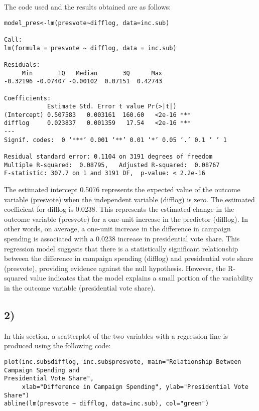 \documentclass[oneside]{article}
\begin{document}
\hspace{1}

The code used and the results obtained are as follows:
\begin{verbatim}
model_pres<-lm(presvote~difflog, data=inc.sub)

Call:
lm(formula = presvote ~ difflog, data = inc.sub)

Residuals:
     Min       1Q   Median       3Q      Max 
-0.32196 -0.07407 -0.00102  0.07151  0.42743 

Coefficients:
            Estimate Std. Error t value Pr(>|t|)    
(Intercept) 0.507583   0.003161  160.60   <2e-16 ***
difflog     0.023837   0.001359   17.54   <2e-16 ***
---
Signif. codes:  0 ‘***’ 0.001 ‘**’ 0.01 ‘*’ 0.05 ‘.’ 0.1 ‘ ’ 1

Residual standard error: 0.1104 on 3191 degrees of freedom
Multiple R-squared:  0.08795,	Adjusted R-squared:  0.08767 
F-statistic: 307.7 on 1 and 3191 DF,  p-value: < 2.2e-16
\end{verbatim}

The estimated intercept 0.5076 represents the expected value of the outcome variable (presvote) when the independent variable (difflog) is zero. 
The estimated coefficient for difflog is 0.0238. This represents the estimated change in the outcome variable (presvote) for a one-unit increase in the predictor (difflog). In other words, on average, a one-unit increase in the difference in campaign spending is associated with a 0.0238 increase in presidential vote share.
This regression model suggests that there is a statistically significant relationship between the difference in campaign spending (difflog) and presidential vote share (presvote), providing evidence against the null hypothesis. However, the R-squared value indicates that the model explains a small portion of the variability in the outcome variable (presidential vote share).

\subsection*{2)}

In this section, a scatterplot of the two variables with a regression line is produced using the following code:
\begin{verbatim}
plot(inc.sub$difflog, inc.sub$presvote, main="Relationship Between Campaign Spending and
Presidential Vote Share", 
     xlab="Difference in Campaign Spending", ylab="Presidential Vote Share")
abline(lm(presvote ~ difflog, data=inc.sub), col="green")
\end{verbatim}
\pagebreak
\end{document}
